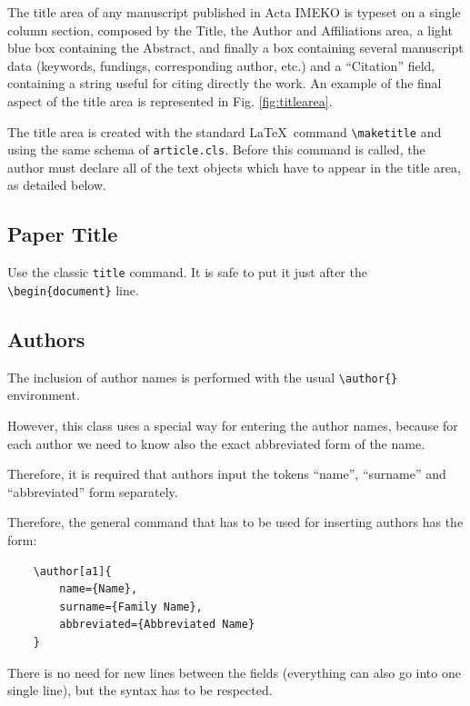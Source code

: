 \documentclass[11pt,onecolumn,notitlepage]{article}
\begin{document}
The title area of any manuscript published in Acta IMEKO is typeset on a single column section, composed by the Title, the Author and Affiliations area, a light blue box containing the Abstract, and finally a box containing several manuscript data (keywords, fundings, corresponding author, etc.) and a ``Citation'' field, containing a string useful for citing directly the work. An example of the final aspect of the title area is represented in Fig. \ref{fig:titlearea}.

The title area is created with the standard \LaTeX\ command \verb|\maketitle| and using the same schema of {\tt article.cls}.
Before this command is called, the author must declare all of the text objects which have to appear in the title area, as detailed below.

\subsection{Paper Title} \label{sec:sub1}

Use the classic \verb|title| command. It is safe to put it just after the \verb|\begin{document}| line.

\subsection{Authors}

The inclusion of author names is performed with the usual \verb|\author{}| environment.

However, this class uses a special way for entering the author names, because for each author we need to know also the exact abbreviated form of the name.

Therefore, it is required that authors input the tokens ``name'', ``surname'' and ``abbreviated'' form separately.

Therefore, the general command that has to be used for inserting authors has the form:
\begin{verbatim}
	\author[a1]{
		name={Name},
		surname={Family Name},
		abbreviated={Abbreviated Name}
	}
\end{verbatim}

There is no need for new lines between the fields (everything can also go into one single line), but the syntax has to be respected.
\end{document}
